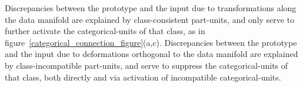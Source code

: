 \documentclass{article} %
\begin{document}

Discrepancies between the prototype and the input due to transformations along the data manifold are explained by class-consistent part-units, and only serve to further activate the categorical-units of that class, as in figure~\ref{categorical_connection_figure}(a,c).
Discrepancies between the prototype and the input due to deformations orthogonal to the data manifold are explained by class-incompatible part-units, and serve to suppress the categorical-units of that class, both directly and via activation of incompatible categorical-units.  %
\end{document}
